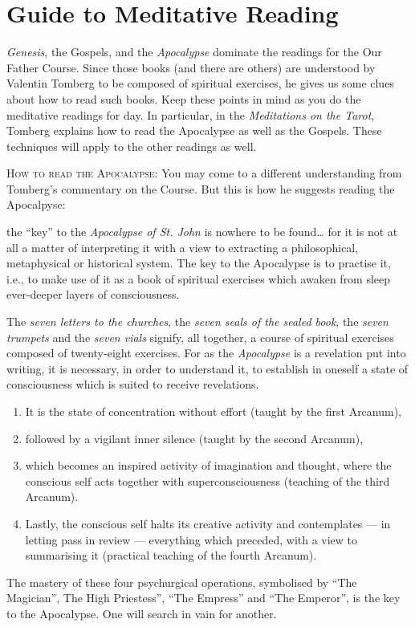 \section{Guide to Meditative Reading}

\emph{Genesis}, the Gospels, and the \emph{Apocalypse} dominate the readings for the Our Father Course. Since those
books (and there are others) are understood by Valentin Tomberg to be composed of spiritual exercises, he gives us some
clues about how to read such books. Keep these points in mind as you do the meditative readings for day. In particular,
in the \emph{Meditations on the Tarot}, Tomberg explains how to read the Apocalypse as well as the Gospels. These
techniques will apply to the other readings as well.

\textsc{How to read the Apocalypse:}
You may come to a different understanding from Tomberg's commentary on the Course. But this is how
he suggests reading the Apocalpyse:

\begin{quotationx}
the “key” to the \emph{Apocalypse of St. John} is nowhere to be found… for it is not at all a matter of interpreting it
with a view to extracting a philosophical, metaphysical or historical system. The key to the Apocalypse is to practise
it, i.e., to make use of it as a book of spiritual exercises which awaken from sleep ever-deeper layers of
consciousness.

The \emph{seven letters to the churches}, the \emph{seven seals of the sealed book}, the \emph{seven trumpets} and the
\emph{seven vials} signify, all together, a course of spiritual exercises composed of twenty-eight exercises. For as
the \emph{Apocalypse} is a revelation put into writing, it is necessary, in order to understand it, to establish in
oneself a state of consciousness which is suited to receive revelations.

\begin{enumerate}
\item
It is the state of concentration without effort (taught by the first Arcanum), 
\item
followed by a vigilant inner silence (taught by the second Arcanum), 
\item
which becomes an inspired activity of imagination and thought, where the conscious self acts together with
superconsciousness (teaching of the third Arcanum). 
\item
Lastly, the conscious self halts its creative activity and contemplates — in letting pass in review — everything which preceded, with a view to summarising it (practical teaching of the fourth
Arcanum). 
\end{enumerate}
The mastery of these four psychurgical operations, symbolised by “The Magician”, The High Priestess”, “The Empress” and
“The Emperor”, is the key to the Apocalypse. One will search in vain for another. 

\end{quotationx}

